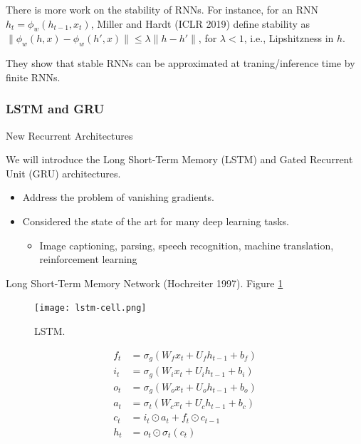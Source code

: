\documentclass[english]{article}
\begin{document}

\item There is more work on the stability of RNNs. For instance, for an RNN $h_t = \phi_w(h_{t-1},x_t)$, Miller and Hardt (ICLR 2019) define stability as $\|\phi_w(h,x)-\phi_w(h',x)\|\le \lambda \|h-h'\|$, for $\lambda<1$, i.e., Lipshitzness in $h$. 

They show that stable RNNs can be approximated at traning/inference time by finite RNNs.

 \eenum

\subsubsection{LSTM and GRU}
\benum
\item 
 {New Recurrent Architectures}

We will introduce the Long Short-Term Memory (LSTM) and Gated Recurrent Unit (GRU) architectures. 
\begin{itemize}
\item Address the problem of vanishing gradients.
\item Considered the state of the art for many deep learning tasks.
\begin{itemize}
\item Image captioning, parsing, speech recognition, machine translation, reinforcement learning
\end{itemize}
\end{itemize}
 

\item 
 {Long Short-Term Memory Network (Hochreiter 1997)}.  Figure \ref{LSTM}

\begin{figure}
\centering
\texttt{[image: lstm-cell.png]}
    \caption{LSTM.}
    \label{LSTM}
\end{figure}

\begin{align*}
f_t &= \sigma_g(W_fx_t+U_fh_{t-1}+b_f)\\
i_t &= \sigma_g(W_ix_t+U_ih_{t-1}+b_i)\\
o_t &= \sigma_g(W_ox_t+U_oh_{t-1}+b_o)\\
a_t &= \sigma_t(W_cx_t+U_ch_{t-1}+b_c)\\
c_t &= i_t\odot a_t +f_t\odot c_{t-1}\\
h_t &= o_t\odot \sigma_t(c_t)
\end{align*}
 
\end{document}
